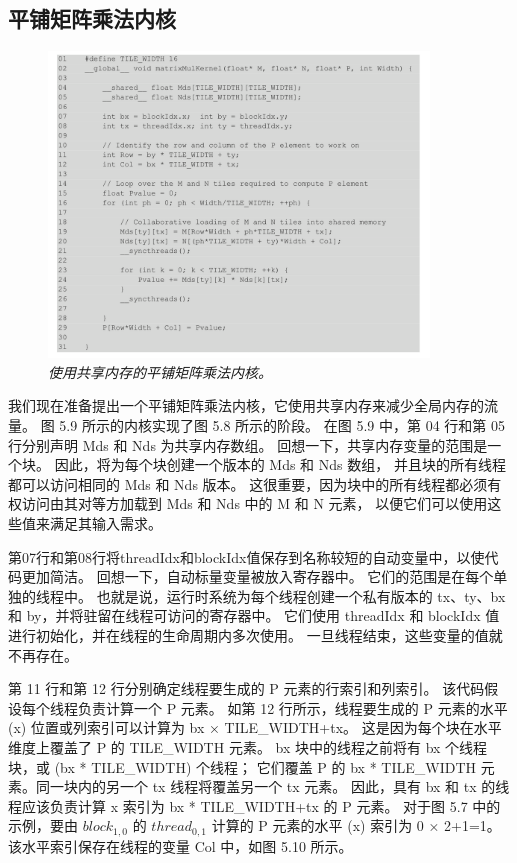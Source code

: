 \subsection{平铺矩阵乘法内核}
\begin{figure}[H]
	\centering
	\includegraphics[width=0.9\textwidth]{figs/F5.9.png}
	\caption{\textit{使用共享内存的平铺矩阵乘法内核。}}
\end{figure}

我们现在准备提出一个平铺矩阵乘法内核，它使用共享内存来减少全局内存的流量。 
图 5.9 所示的内核实现了图 5.8 所示的阶段。 在图 5.9 中，第 04 行和第 05 行分别声明 Mds 和 Nds 为共享内存数组。 
回想一下，共享内存变量的范围是一个块。 因此，将为每个块创建一个版本的 Mds 和 Nds 数组，
并且块的所有线程都可以访问相同的 Mds 和 Nds 版本。 
这很重要，因为块中的所有线程都必须有权访问由其对等方加载到 Mds 和 Nds 中的 M 和 N 元素，
以便它们可以使用这些值来满足其输入需求。

第07行和第08行将threadIdx和blockIdx值保存到名称较短的自动变量中，以使代码更加简洁。 
回想一下，自动标量变量被放入寄存器中。 它们的范围是在每个单独的线程中。 
也就是说，运行时系统为每个线程创建一个私有版本的 tx、ty、bx 和 by，并将驻留在线程可访问的寄存器中。 
它们使用 threadIdx 和 blockIdx 值进行初始化，并在线程的生命周期内多次使用。 一旦线程结束，这些变量的值就不再存在。

第 11 行和第 12 行分别确定线程要生成的 P 元素的行索引和列索引。 该代码假设每个线程负责计算一个 P 元素。 
如第 12 行所示，线程要生成的 P 元素的水平 (x) 位置或列索引可以计算为 bx × TILE\_WIDTH+tx。 
这是因为每个块在水平维度上覆盖了 P 的 TILE\_WIDTH 元素。 
bx 块中的线程之前将有 bx 个线程块，或 (bx * TILE\_WIDTH) 个线程； 
它们覆盖 P 的 bx * TILE\_WIDTH 元素。同一块内的另一个 tx 线程将覆盖另一个 tx 元素。 
因此，具有 bx 和 tx 的线程应该负责计算 x 索引为 bx * TILE\_WIDTH+tx 的 P 元素。 
对于图 5.7 中的示例，要由 $block_{1,0}$ 的 $thread_{0,1}$ 计算的 P 元素的水平 (x) 索引为 0 × 2+1=1。 
该水平索引保存在线程的变量 Col 中，如图 5.10 所示。


